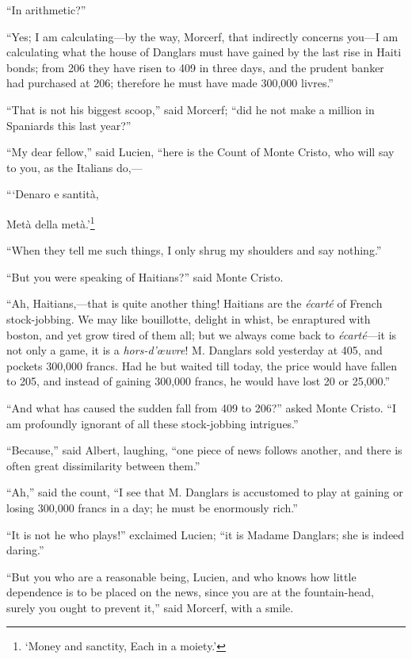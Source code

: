 “In arithmetic?”

“Yes; I am calculating—by the way, Morcerf, that indirectly concerns
you—I am calculating what the house of Danglars must have gained by the
last rise in Haiti bonds; from 206 they have risen to 409 in three
days, and the prudent banker had purchased at 206; therefore he must
have made 300,000 livres.”

“That is not his biggest scoop,” said Morcerf; “did he not make a
million in Spaniards this last year?”

“My dear fellow,” said Lucien, “here is the Count of Monte Cristo, who
will say to you, as the Italians do,—

\hspace{1cm}“‘Denaro e santità,

\hspace{1cm}Metà della metà.’\footnote[9]{‘Money and sanctity, Each in a moiety.’}


“When they tell me such things, I only shrug my shoulders and say
nothing.”

“But you were speaking of Haitians?” said Monte Cristo.

“Ah, Haitians,—that is quite another thing! Haitians are the \textit{écarté}
of French stock-jobbing. We may like bouillotte, delight in whist, be
enraptured with boston, and yet grow tired of them all; but we always
come back to \textit{écarté}—it is not only a game, it is a \textit{hors-d’œuvre}! M.
Danglars sold yesterday at 405, and pockets 300,000 francs. Had he but
waited till today, the price would have fallen to 205, and instead of
gaining 300,000 francs, he would have lost 20 or 25,000.”

“And what has caused the sudden fall from 409 to 206?” asked Monte
Cristo. “I am profoundly ignorant of all these stock-jobbing
intrigues.”

“Because,” said Albert, laughing, “one piece of news follows another,
and there is often great dissimilarity between them.”

“Ah,” said the count, “I see that M. Danglars is accustomed to play at
gaining or losing 300,000 francs in a day; he must be enormously rich.”

“It is not he who plays!” exclaimed Lucien; “it is Madame Danglars; she
is indeed daring.”

“But you who are a reasonable being, Lucien, and who knows how little
dependence is to be placed on the news, since you are at the
fountain-head, surely you ought to prevent it,” said Morcerf, with a
smile.

